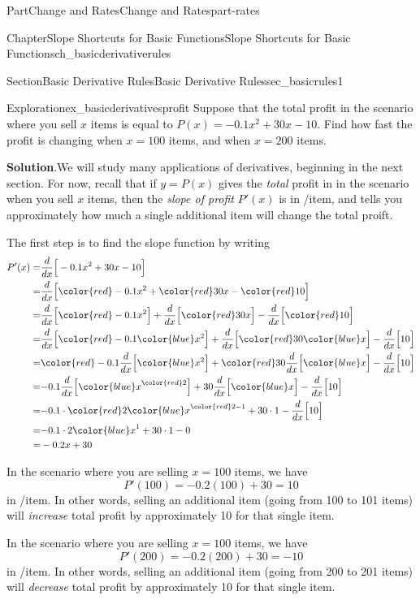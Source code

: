 \documentclass{tufte-book}
\newcommand{\blocktitlefont}{\relax}
\numberwithin{equation}{chapter}
\newcommand{\red}[1]{   {\color{red}   #1}   }
\newcommand{\blue}[1]{  {\color{blue}  #1}  }
\newcommand{\ddx}[1]{ \dfrac{d}{dx} \Big[ #1 \Big]  }
\newcommand{\amp}{&}
\begin{document}
\begin{partptx}{Part}{Change and Rates}{}{Change and Rates}{}{}{part-rates}
\begin{chapterptx}{Chapter}{Slope Shortcuts for Basic Functions}{}{Slope Shortcuts for Basic Functions}{}{}{ch_basicderivativerules}
\begin{sectionptx}{Section}{Basic Derivative Rules}{}{Basic Derivative Rules}{}{}{sec_basicrules1}
\begin{exploration}{Exploration}{}{ex_basicderivativesprofit}
Suppose that the total profit in the scenario where you sell \(x\) items is equal to \(P(x) = -0.1x^2 + 30x - 10\). Find how fast the profit is changing when \(x=100\) items, and when \(x=200\) items.%
\par\smallskip%
\noindent\textbf{\blocktitlefont Solution}.\hypertarget{ex_basicderivativesprofit-2}{}\quad{}We will study many applications of derivatives, beginning in the next section.  For now, recall that if \(y=P(x)\) gives the \emph{total} profit in \textdollar{} in the scenario when you sell \(x\) items, then the \emph{slope of profit} \(P'(x)\) is in \textdollar{}\slash{}item, and tells you approximately how much a single additional item will change the total proift.%
\par
The first step is to find the slope function by writing%
\begin{align*}
P'(x) = \amp \ddx{ -0.1x^2 + 30x - 10 } \\
= \amp \ddx{ \red{-0.1x^2} + \red{30x} - \red{10} } \\
= \amp \ddx{\red{-0.1x^2}} + \ddx{\red{30x}} - \ddx{ \red{10} }  \\
= \amp \ddx{ \red{-0.1}\blue{x^2} } + \ddx{ \red{30} \blue{x} } - \ddx{ 10}  \\
= \amp \red{-0.1} \ddx{ \blue{x^2} } + \red{30}\ddx{ \blue{x} } - \ddx{ 10}  \\
= \amp { -0.1} \ddx{ \blue{x}^{\red{2}} } + {30}\ddx{ \blue{x} }  - \ddx{ 10}  \\
= \amp { -0.1} \cdot{ \red{2} \blue{x}^{\red{2}-1}} + {30} \cdot{ 1 } - \ddx{ 10}  \\
= \amp { -0.1} \cdot 2 \blue{x}^{1} + {30} \cdot{ 1 } - 0 \\
= \amp -0.2 x + 30  
\end{align*}
%
\par
In the scenario where you are selling \(x=100\) items, we have%
\begin{equation*}
P'(100) = -0.2(100) + 30 = 10
\end{equation*}
in \textdollar{}\slash{}item. In other words, selling an additional item (going from 100 to 101 items) will \emph{increase} total profit by approximately 10\textdollar{} for that single item.%
\par
In the scenario where you are selling \(x=100\) items, we have%
\begin{equation*}
P'(200) = -0.2(200) + 30 = -10
\end{equation*}
in \textdollar{}\slash{}item. In other words, selling an additional item (going from 200 to 201 items) will \emph{decrease} total profit by approximately 10\textdollar{} for that single item.%

\end{exploration}
\end{sectionptx}
\end{chapterptx}
\end{partptx}
\end{document}
